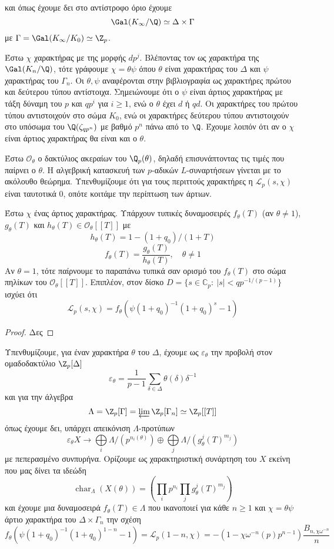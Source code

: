 και όπως έχουμε δει στο αντίστροφο όριο έχουμε
$$\Gal(K_\infty/\Q) \simeq \Delta \times \Gamma $$ 
με $\Gamma = \Gal(K_\infty/K_0) \simeq \Z_p$.


Έστω $\chi$ χαρακτήρας με  της μορφής $dp^j$. Βλέποντας τον ως χαρακτήρα της $\Gal(K_n/\Q)$, τότε γράφουμε $\chi = \theta \psi$ όπου $\theta$ είναι χαρακτήρας του $\Delta$ και $\psi$ χαρακτήρας του $\Gamma_n$. Οι $\theta,\psi$ αναφέρονται στην βιβλιογραφία ως χαρακτήρες πρώτου και δεύτερου τύπου αντίστοιχα. Σημειώνουμε ότι ο $\psi$ είναι άρτιος χαρακτήρας με τάξη δύναμη του $p$ και  $qp^i$ για $i\geq 1$, ενώ ο $\theta$ έχει  $d$ ή $qd$. Οι χαρακτήρες του πρώτου τύπου αντιστοιχούν στο σώμα $K_0$, ενώ οι χαρακτήρες δεύτερου τύπου αντιστοιχούν στο υπόσωμα του $\Q(\zeta_{qp^n})$ με βαθμό $p^n$ πάνω από το $\Q$. Έχουμε λοιπόν ότι αν ο $\chi$ είναι άρτιος χαρακτήρας θα είναι και ο $\theta$. 

Έστω $\mathcal{O}_{\theta}$ ο δακτύλιος ακεραίων του $\Q_p(\theta)$, δηλαδή επισυνάπτοντας τις τιμές που παίρνει ο $\theta$. Η αλγεβρική κατασκευή των $p$-αδικών $L$-συναρτήσεων γίνεται με το ακόλουθο θεώρημα. Υπενθυμίζουμε ότι για τους περιττούς χαρακτήρες η $\mathcal{L}_p(s,\chi)$ είναι ταυτοτικά 0, οπότε κοιτάμε την περίπτωση των άρτιων.

\begin{theorem} Έστω $\chi$ ένας άρτιος χαρακτήρας. Υπάρχουν τυπικές δυναμοσειρές $f_\theta(T)$ (αν $\theta \neq 1$), $g_{\theta}(T)$ και $h_\theta(T) \in \mathcal{O}_\theta [[T]]$ με 
	$$h_\theta (T) = 1-(1+q_0)/(1+T)$$
	$$f_\theta(T) = \frac{g_\theta(T)}{h_\theta(T)}, \quad \theta \neq 1$$
	Αν $\theta =1$, τότε παίρνουμε το παραπάνω τυπικά σαν ορισμό του $f_\theta(T)$ στο σώμα πηλίκων του $\mathcal{O}_\theta[[T]]$. Επιπλέον, στον δίσκο $D = \{ s \in \mathbb{C}_p: \ |s| < qp^{-1/(p-1)}\}$ ισχύει ότι
	$$\mathcal{L}_p (s,\chi) = f_{\theta}(\psi(1+q_0)^{-1}(1+q_0)^s -1)$$
\end{theorem}
\begin{proof}
	Δες 
\end{proof}
Υπενθυμίζουμε, για έναν χαρακτήρα $\theta$ του $\Delta$, έχουμε ως $\varepsilon_{\theta}$ την προβολή στον ομαδοδακτύλιο $\Z_p[\Delta]$
$$\varepsilon_{\theta} = \frac{1}{p-1}\sum\limits_{\delta \in \Delta}\theta(\delta)\delta^{-1}$$ και για την άλγεβρα 
$$\Lambda  = \Z_p[\Gamma] = \varprojlim \Z_p[\Gamma_n] \simeq \Z_p[[T]]$$
όπως έχουμε δει, υπάρχει απεικόνιση $\Lambda$-προτύπων
$$\varepsilon_{\theta}X \longrightarrow \bigoplus \limits_{i}\Lambda / (p^{n_i(\theta)}) \oplus \bigoplus\limits_j \Lambda /(g_{\theta}^j(T)^{m_j})$$
με πεπερασμένο συνπυρήνα. Ορίζουμε ως χαρακτηριστική συνάρτηση του $X$ εκείνη που μας δίνει τα ιδεώδη
$$\operatorname{char}_{\Lambda}(X(\theta)) = \left( \prod\limits_{i} p^{n_i}\prod\limits_j g^j_{\theta}(T)^{m_j}\right)$$
και έχουμε μια δυναμοσειρά $f_\theta(T) \in \Lambda$ που ικανοποιεί για κάθε $n\geq 1$ και $\chi = \theta\psi$ άρτιο χαρακτήρα του $\Delta \times \Gamma_n$ την σχέση
$$f_{\theta}(\psi(1+q_0)^{-1}(1+q_0)^{1-n} -1 ) = \mathcal{L}_p(1-n,\chi) = -(1-\chi\omega^{-n}(p)p^{n-1})\frac{B_{n,\chi\omega^{-n}}}{n}$$

